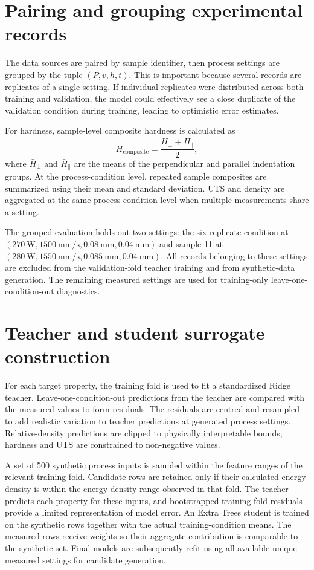 \documentclass[12pt,a4paper,oneside]{report}
\begin{document}
\section{Pairing and grouping experimental records}
The data sources are paired by sample identifier, then process settings are grouped by the tuple $(P,v,h,t)$. This is important because several records are replicates of a single setting. If individual replicates were distributed across both training and validation, the model could effectively see a close duplicate of the validation condition during training, leading to optimistic error estimates.

For hardness, sample-level composite hardness is calculated as
\begin{equation}
  H_{\mathrm{composite}} = \frac{\bar{H}_{\perp}+\bar{H}_{\parallel}}{2},
\end{equation}
where $\bar{H}_{\perp}$ and $\bar{H}_{\parallel}$ are the means of the perpendicular and parallel indentation groups. At the process-condition level, repeated sample composites are summarized using their mean and standard deviation. UTS and density are aggregated at the same process-condition level when multiple measurements share a setting.

The grouped evaluation holds out two settings: the six-replicate condition at $(270~\mathrm{W},1500~\mathrm{mm/s},0.08~\mathrm{mm},0.04~\mathrm{mm})$ and sample 11 at $(280~\mathrm{W},1550~\mathrm{mm/s},0.085~\mathrm{mm},0.04~\mathrm{mm})$. All records belonging to these settings are excluded from the validation-fold teacher training and from synthetic-data generation. The remaining measured settings are used for training-only leave-one-condition-out diagnostics.

\section{Teacher and student surrogate construction}
For each target property, the training fold is used to fit a standardized Ridge teacher. Leave-one-condition-out predictions from the teacher are compared with the measured values to form residuals. The residuals are centred and resampled to add realistic variation to teacher predictions at generated process settings. Relative-density predictions are clipped to physically interpretable bounds; hardness and UTS are constrained to non-negative values.

A set of 500 synthetic process inputs is sampled within the feature ranges of the relevant training fold. Candidate rows are retained only if their calculated energy density is within the energy-density range observed in that fold. The teacher predicts each property for these inputs, and bootstrapped training-fold residuals provide a limited representation of model error. An Extra Trees student is trained on the synthetic rows together with the actual training-condition means. The measured rows receive weights so their aggregate contribution is comparable to the synthetic set. Final models are subsequently refit using all available unique measured settings for candidate generation.
\end{document}
